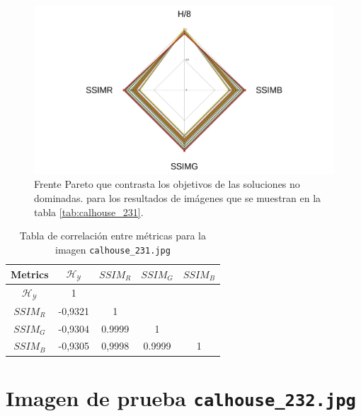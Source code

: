     \begin{figure}[H]
    \centering
    \includegraphics[width=\textwidth]{./Figures/calhouse_231/calhouse_231_2.jpg}
    \caption{Frente Pareto que contrasta los objetivos de las soluciones no dominadas. para los resultados de imágenes que se muestran en la tabla \ref{tab:calhouse_231}.}
    \label{fig:calhouse2312fp}
    \end{figure}

\begin{table}[H]
\setlength{\abovecaptionskip}{2pt plus 3pt minus 2pt} %
\caption[Parámetros de entrada para $MOPSO$]{Tabla de correlación entre métricas para la imagen \texttt{calhouse\_231.jpg}}
\begin{center}
 \begin{tabular}{||c | c c c c||} 
 \hline
Metrics & $\mathscr{H_Y}$ & $SSIM_R$ & $SSIM_G$ & $SSIM_B$ \\ 
\hline
$\mathscr{H_Y}$ & 1 &  &  & \\ 
\hline
$SSIM_R$ & -0,9321 & 1 &  \\ 
\hline
$SSIM_G$ & -0,9304 & 0.9999  & 1  & \\ 
\hline
$SSIM_B$ & -0,9305 & 0,9998  & 0.9999  & 1 \\ 
\hline
\end{tabular}
\end{center}
\label{table:correlacion}
\end{table}

\section{Imagen de prueba \texttt{calhouse\_232.jpg}}


